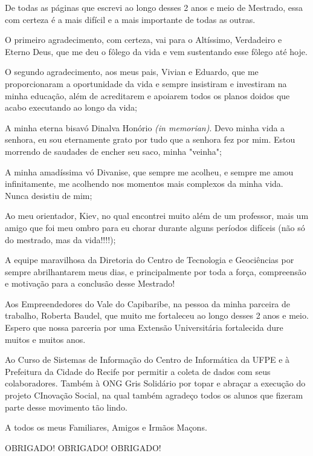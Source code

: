\begin{agradecimentos}

De todas as páginas que escrevi ao longo desses 2 anos e meio de Mestrado, essa com certeza é a mais difícil e a mais importante de todas as outras.

O primeiro agradecimento, com certeza, vai para o Altíssimo, Verdadeiro e Eterno Deus, que me deu o fôlego da vida e vem sustentando esse fôlego até hoje.

O segundo agradecimento, aos meus pais, Vivian e Eduardo, que me proporcionaram a oportunidade da vida e sempre insistiram e investiram na minha educação, além de acreditarem e apoiarem todos os planos doidos que acabo executando ao longo da vida;

A minha eterna bisavó Dinalva Honório \textit{(in memorian)}. Devo minha vida a senhora, eu sou eternamente grato por tudo que a senhora fez por mim. Estou morrendo de saudades de encher seu saco, minha "veinha";

A minha amadíssima vó Divanise, que sempre me acolheu, e sempre me amou infinitamente, me acolhendo nos momentos mais complexos da minha vida. Nunca desistiu de mim;

Ao meu orientador, Kiev, no qual encontrei muito além de um professor, mais um amigo que foi meu ombro para eu chorar durante alguns períodos difíceis (não só do mestrado, mas da vida!!!!);

A equipe maravilhosa da Diretoria do Centro de Tecnologia e Geociências por sempre abrilhantarem meus dias, e principalmente por toda a força, compreensão e motivação para a conclusão desse Mestrado!

Aos Empreendedores do Vale do Capibaribe, na pessoa da minha parceira de trabalho, Roberta Baudel, que muito me fortaleceu ao longo desses 2 anos e meio. Espero que nossa parceria por uma Extensão Universitária fortalecida dure muitos e muitos anos.

Ao Curso de Sistemas de Informação do Centro de Informática da UFPE e à Prefeitura da Cidade do Recife por permitir a coleta de dados com seus colaboradores. Também à ONG Gris Solidário por topar e abraçar a execução do projeto CInovação Social, na qual também agradeço todos os alunos que fizeram parte desse movimento tão lindo.

A todos os meus Familiares, Amigos e Irmãos Maçons.

OBRIGADO! OBRIGADO! OBRIGADO!

\end{agradecimentos}